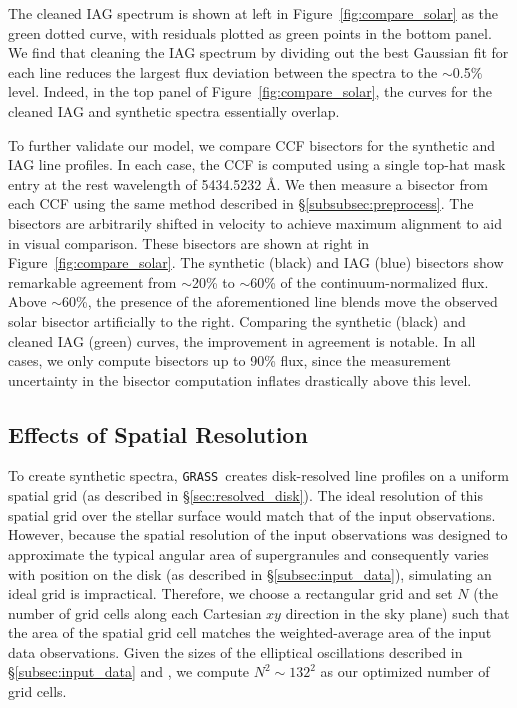\documentclass[twocolumn]{aastex63}
\newcommand{\grass}{\texttt{GRASS}}
\newcommand{\revise}[1]{#1}
\begin{document}
The cleaned IAG spectrum is shown at left in Figure~\ref{fig:compare_solar} as the green dotted curve, with residuals plotted as green points in the bottom panel. \revise{We find that cleaning the IAG spectrum by} dividing out the best Gaussian fit for each line reduces the largest flux deviation \revise{between the spectra} to the $\sim$0.5$\%$ level. Indeed, in the top panel of Figure~\ref{fig:compare_solar}, the curves for the cleaned IAG and synthetic spectra essentially overlap. \par

To further validate our model, we compare CCF bisectors for the synthetic and IAG line profiles. In each case, the CCF is computed using a single top-hat mask entry at the rest wavelength of 5434.5232 \AA. We then measure a bisector from each CCF using the same method described in \S\ref{subsubsec:preprocess}. The bisectors are arbitrarily shifted in velocity to achieve maximum alignment to aid in visual comparison. These bisectors are shown at right in Figure~\ref{fig:compare_solar}. The synthetic (black) and IAG (blue) bisectors show remarkable agreement from $\sim$20\% to $\sim$60\% of the continuum-normalized flux. Above $\sim$60\%, the presence of the aforementioned line blends move the observed solar bisector artificially to the right. Comparing the synthetic (black) and cleaned IAG (green) curves, the improvement in agreement is notable. In all cases, we only compute bisectors up to 90\% flux, since the measurement uncertainty in the bisector computation inflates drastically above this level. \par 

\subsection{Effects of Spatial Resolution} \label{subsec:res}

\revise{To create synthetic spectra, \grass\ creates disk-resolved line profiles on a uniform spatial grid (as described in \S\ref{sec:resolved_disk}).} The \revise{ideal resolution of this spatial grid over the stellar surface would match that of the input observations. However, because the spatial resolution of the input observations was designed to approximate the typical angular area of supergranules and consequently varies with position on the disk (as described in \S\ref{subsec:input_data}), simulating an ideal grid is impractical.} Therefore, we choose \revise{a rectangular grid and set} $N$ \revise{(the number of grid cells along each Cartesian $xy$ direction in the sky plane) such that the area of the spatial grid cell matches the weighted-average area of the input data observations. Given the sizes of the elliptical oscillations described in \S\ref{subsec:input_data} and \citetalias{Lohner-Bottcher2018}, we compute $N^2\sim132^2$ as our optimized number of grid cells.} \par
\end{document}

